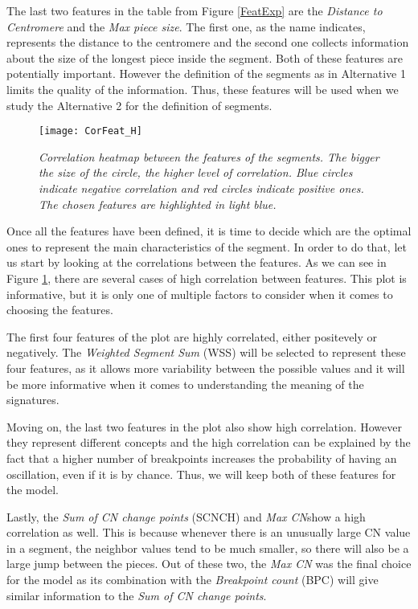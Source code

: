 \documentclass[a4paper]{article}
\begin{document}
The last two features in the table from Figure \ref{FeatExp} are the \textit{Distance to Centromere} and the \textit{Max piece size}. The first one, as the name indicates, represents the distance to the centromere and the second one collects information about the size of the longest piece inside the segment. Both of these features are potentially important. However the definition of the segments as in Alternative 1 limits the quality of the information. Thus, these features will be used when we study the Alternative 2 for the definition of segments.

\begin{figure}[h] 
	\centering
	\texttt{[image: CorFeat\_H]} 
	\caption{\textit{Correlation heatmap between the features of the segments. The bigger the size of the circle, the higher level of correlation. Blue circles indicate negative correlation and red circles indicate positive ones. The chosen features are highlighted in light blue.}} \label{CorFeat}
\end{figure}

Once all the features have been defined, it is time to decide which are the optimal ones to represent the main characteristics of the segment. In order to do that, let us start by looking at the correlations between the features. As we can see in Figure \ref{CorFeat}, there are several cases of high correlation between features. This plot is informative, but it is only one of multiple factors to consider when it comes to choosing the features. 

The first four features of the plot are highly correlated, either positevely or negatively. The \textit{Weighted Segment Sum} (WSS) will be selected to represent these four features, as it allows more variability between the possible values and it will be more informative when it comes to understanding the meaning of the signatures. 

Moving on, the last two features in the plot also show high correlation. However they represent different concepts and the high correlation can be explained by the fact that a higher number of breakpoints increases the probability of having an oscillation, even if it is by chance. Thus, we will keep both of these features for the model.

Lastly, the \textit{Sum of CN change points} (SCNCH) and \textit{Max CN}show a high correlation as well. This is because whenever there is an unusually large CN value in a segment, the neighbor values tend to be much smaller, so there will also be a large jump between the pieces. Out of these two, the \textit{Max CN} was the final choice for the model as its combination with the \textit{Breakpoint count} (BPC) will give similar information to the \textit{Sum of CN change points}. 
\end{document}
